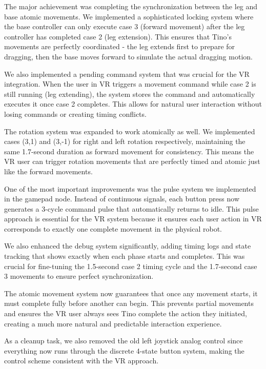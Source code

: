 The major achievement was completing the synchronization between the leg and base atomic movements. We implemented a sophisticated locking system where the base controller can only execute case 3 (forward movement) after the leg controller has completed case 2 (leg extension). This ensures that Tino's movements are perfectly coordinated - the leg extends first to prepare for dragging, then the base moves forward to simulate the actual dragging motion.

We also implemented a pending command system that was crucial for the VR integration. When the user in VR triggers a movement command while case 2 is still running (leg extending), the system stores the command and automatically executes it once case 2 completes. This allows for natural user interaction without losing commands or creating timing conflicts.

The rotation system was expanded to work atomically as well. We implemented cases (3,1) and (3,-1) for right and left rotation respectively, maintaining the same 1.7-second duration as forward movement for consistency. This means the VR user can trigger rotation movements that are perfectly timed and atomic just like the forward movements.

One of the most important improvements was the pulse system we implemented in the gamepad node. Instead of continuous signals, each button press now generates a 3-cycle command pulse that automatically returns to idle. This pulse approach is essential for the VR system because it ensures each user action in VR corresponds to exactly one complete movement in the physical robot.

We also enhanced the debug system significantly, adding timing logs and state tracking that shows exactly when each phase starts and completes. This was crucial for fine-tuning the 1.5-second case 2 timing cycle and the 1.7-second case 3 movements to ensure perfect synchronization.

The atomic movement system now guarantees that once any movement starts, it must complete fully before another can begin. This prevents partial movements and ensures the VR user always sees Tino complete the action they initiated, creating a much more natural and predictable interaction experience.

As a cleanup task, we also removed the old left joystick analog control since everything now runs through the discrete 4-state button system, making the control scheme consistent with the VR approach.


